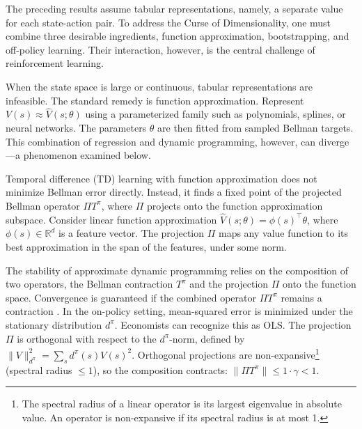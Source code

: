 The preceding results assume tabular representations, namely, a separate value for each state-action pair. To address the Curse of Dimensionality, one must combine three desirable ingredients, function approximation, bootstrapping, and off-policy learning. Their interaction, however, is the central challenge of reinforcement learning.

When the state space is large or continuous, tabular representations are infeasible. The standard remedy is function approximation. Represent $V(s) \approx \hat{V}(s; \theta)$ using a parameterized family such as polynomials, splines, or neural networks. The parameters $\theta$ are then fitted from sampled Bellman targets. This combination of regression and dynamic programming, however, can diverge---a phenomenon examined below.

Temporal difference (TD) learning with function approximation does not minimize Bellman error directly. Instead, it finds a fixed point of the projected Bellman operator $\Pi T^\pi$, where $\Pi$ projects onto the function approximation subspace. Consider linear function approximation $\hat{V}(s; \theta) = \phi(s)^\top \theta$, where $\phi(s) \in \mathbb{R}^d$ is a feature vector. The projection $\Pi$ maps any value function to its best approximation in the span of the features, under some norm.

The stability of approximate dynamic programming relies on the composition of two operators, the Bellman contraction $T^\pi$ and the projection $\Pi$ onto the function space. Convergence is guaranteed if the combined operator $\Pi T^\pi$ remains a contraction \citep{tsitsiklis1997}. In the on-policy setting, mean-squared error is minimized under the stationary distribution $d^\pi$. Economists can recognize this as OLS. The projection $\Pi$ is orthogonal with respect to the $d^\pi$-norm, defined by $\|V\|_{d^\pi}^2 = \sum_s d^\pi(s) V(s)^2$. Orthogonal projections are non-expansive\footnote{The spectral radius of a linear operator is its largest eigenvalue in absolute value. An operator is non-expansive if its spectral radius is at most 1.} (spectral radius $\leq 1$), so the composition contracts: $\|\Pi T^\pi\| \leq 1 \cdot \gamma < 1$.

